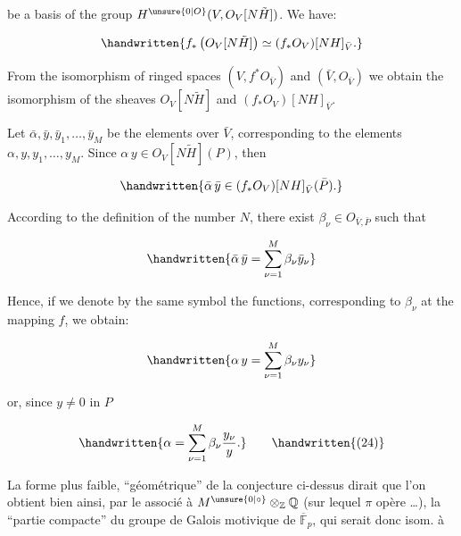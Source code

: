 



be a basis of the group $H^{\unsure{0|O}}(V,O_V[N\tilde H])$. We have:

\[
\handwritten{f_*\left(O_V[N\tilde H]\right)\simeq(f_*O_V)[NH]_{\bar V}.}
\]

From the isomorphism of ringed spaces $(V,f^*O_{\bar V})$ and $(\bar V,O_{\bar V})$
we obtain the isomorphism of the sheaves $O_V[N\tilde H]$ and
$(f_*O_V)[NH]_{\bar V}$.

Let $\bar\alpha,\bar y,\bar y_1,\ldots,\bar y_M$ be the elements over $\bar V$, corresponding
to the elements $\alpha,y,y_1,\ldots,y_M$. Since $\alpha\,y\in O_V[N\tilde H](P)$, then

\[
\handwritten{\bar\alpha\,\bar y\in(f_*O_V)[NH]_{\bar V}(\bar P).}
\]

According to the definition of the number $N$, there
exist $\beta_\nu\in O_{\bar V,\bar P}$ such that

\[
\handwritten{\bar\alpha\,\bar y=\sum_{\nu=1}^{M}\beta_\nu\bar y_\nu}
\]

Hence, if we denote by the same symbol the functions,
corresponding to $\beta_\nu$ at the mapping $f$, we obtain:

\[
\handwritten{\alpha\,y=\sum_{\nu=1}^{M}\beta_\nu  y_\nu}
\]

or, since $y\ne0$ in $P$

\[
\handwritten{\alpha=\sum_{\nu=1}^{M}\beta_\nu\frac{y_\nu}{y}.}\tag*{\handwritten{(24)}}
\]



La forme plus faible, ``géométrique'' de la
conjecture ci-dessus dirait que  l'on obtient
bien ainsi, par le  associé à
$M^{\unsure{0|\circ}}\otimes_{\mathbb Z}\mathbb Q$ (sur lequel $\pi$ opère \ldots), la
 ``partie compacte'' du  groupe de Galois
motivique de $\overline{\mathbb F}_p$, qui serait donc isom. à

